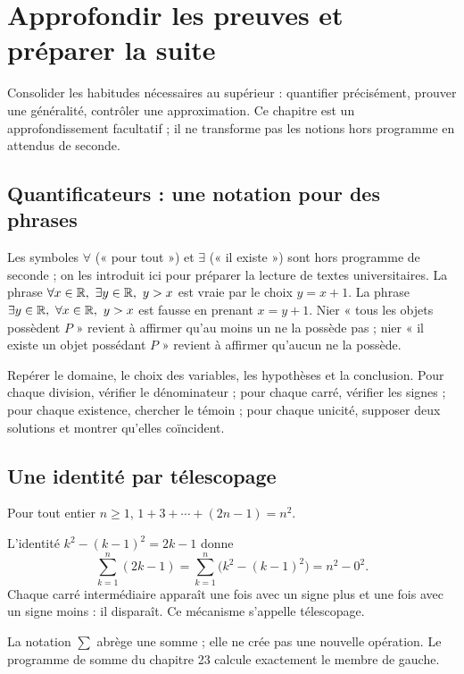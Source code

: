 \documentclass[../cours_2de.tex]{subfiles}
\begin{document}
\setcounter{chapter}{23}
\chapter{Approfondir les preuves et préparer la suite}
\label{sec:ch24}
\begin{objectif}
Consolider les habitudes nécessaires au supérieur : quantifier précisément, prouver une généralité, contrôler une approximation. Ce chapitre est un approfondissement facultatif ; il ne transforme pas les notions hors programme en attendus de seconde.
\end{objectif}
\section{Quantificateurs : une notation pour des phrases}
Les symboles $\forall$ (« pour tout ») et $\exists$ (« il existe ») sont hors programme de seconde ; on les introduit ici pour préparer la lecture de textes universitaires.
La phrase $\forall x\in\mathbb{R},\ \exists y\in\mathbb{R},\ y>x$ est vraie par le choix $y=x+1$.
La phrase $\exists y\in\R,\ \forall x\in\R,\ y>x$ est fausse en prenant $x=y+1$.
Nier « tous les objets possèdent $P$ » revient à affirmer qu'au moins un ne la possède pas ; nier « il existe un objet possédant $P$ » revient à affirmer qu'aucun ne la possède.
\begin{methode}
Repérer le domaine, le choix des variables, les hypothèses et la conclusion.
Pour chaque division, vérifier le dénominateur ; pour chaque carré, vérifier les signes ; pour chaque existence, chercher le témoin ; pour chaque unicité, supposer deux solutions et montrer qu'elles coïncident.
\end{methode}
\section{Une identité par télescopage}
\begin{theoreme}
Pour tout entier $n\geq1$, $1+3+\cdots+(2n-1)=n^2$.
\end{theoreme}
\begin{demonstration}
L'identité $k^2-(k-1)^2=2k-1$ donne
\[
\sum_{k=1}^n(2k-1)=\sum_{k=1}^n\bigl(k^2-(k-1)^2\bigr)=n^2-0^2.
\]
Chaque carré intermédiaire apparaît une fois avec un signe plus et une fois avec un signe moins : il disparaît. Ce mécanisme s'appelle télescopage.
\end{demonstration}
La notation $\sum$ abrège une somme ; elle ne crée pas une nouvelle opération. Le programme de somme du chapitre 23 calcule exactement le membre de gauche.
\end{document}
